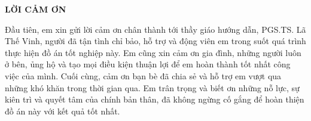 \documentclass[../DoAn.tex]{subfiles}
\begin{document}
\begin{center}
    \Large{\textbf{LỜI CẢM ƠN}}\\
\end{center}
\vspace{1cm}
Đầu tiên, em xin gửi lời cảm ơn chân thành tới thầy giáo hướng dẫn, PGS.TS. Lã Thế Vinh, người đã tận tình chỉ bảo, hỗ trợ và động viên em trong suốt quá trình thực hiện đồ án tốt nghiệp này. Em cũng xin cảm ơn gia đình, những người luôn ở bên, ủng hộ và tạo mọi điều kiện thuận lợi để em hoàn thành tốt nhất công việc của mình. Cuối cùng, cảm ơn bạn bè đã chia sẻ và hỗ trợ em vượt qua những khó khăn trong thời gian qua. Em trân trọng và biết ơn những nỗ lực, sự kiên trì và quyết tâm của chính bản thân, đã không ngừng cố gắng để hoàn thiện đồ án này với kết quả tốt nhất.
\end{document}
